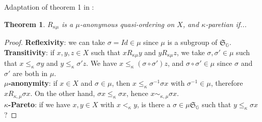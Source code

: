 \documentclass{article}
\newcommand{\G}{\mathbb{G}}
\newtheorem{theorem}{Theorem}
\begin{document}
Adaptation of theorem 1 in \cite{svensson80}:
\begin{theorem}
    $R_{\kappa\mu}$ is a $\mu$-anonymous quasi-ordering on $X$, and
    $\kappa$-paretian if...
\end{theorem}
\begin{proof}
    \textbf{Reflexivity}: we can take $\sigma = Id\in\mu$ since $\mu$ is a
    subgroup of $\mathfrak{S}_\G$.\\
    \textbf{Transitivity}: if $x,y,z\in X$ such that $x R_{\kappa\mu} y$ and 
    $y R_{\kappa\mu} z$,
    we take $\sigma,\sigma'\in \mu$ such that $x\leq_\kappa \sigma y$ and
    $y\leq_\kappa \sigma' z$. We have $x\leq_\kappa (\sigma\circ\sigma')z$,
    and $\sigma\circ\sigma'\in\mu$ since $\sigma$ and $\sigma'$ are both in $\mu$.\\
    \textbf{$\mu$-anonymity}: if $x\in X$ and $\sigma\in\mu$, then
    $x\leq_\kappa\sigma^{-1}\sigma x$ with $\sigma^{-1}\in\mu$,
    therefore $x R_{\kappa,\mu} \sigma x$. On the other hand,
    $\sigma x \leq_{\kappa}\sigma x$, hence $x \sim_{\kappa, \mu}\sigma x$.\\
    \textbf{$\kappa$-Pareto}: if we have $x,y\in X$ with $x<_\kappa y$, is there a
    $\sigma\in \mu\mathfrak{S}_\G$ such that $y\leq_\kappa \sigma x$? 
\end{proof}



\end{document}
